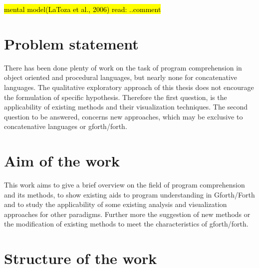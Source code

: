 \hl{mental model(LaToza et al., 2006) read: ..comment}
\begin{comment}
\@inproceedings\{Lieberman:1995:BGC:223904.223969,
author = \{Lieberman, Henry and Fry, Christopher\},
title = \{Bridging the Gulf Between Code and Behavior in Programming\},
booktitle = \{Proceedings of the SIGCHI Conference on Human Factors in Computing Systems\},
series = \{CHI '95\},
year = \{1995\},
isbn = \{0-201-84705-1\},
location = \{Denver, Colorado, USA\},
pages = \{480--486\},
numpages = \{7\},
url = \{http://dx.doi.org/10.1145/223904.223969\},
doi = \{10.1145/223904.223969\},
acmid = \{223969\},
publisher = \{ACM Press/Addison-Wesley Publishing Co.\},
address = \{New York, NY, USA\},
\}
\end{comment}


\section*{Problem statement}

There has been done plenty of work on the task of program comprehension in object oriented and procedural languages\cite{Cornelissen:2009:SSP:1638616.1639301}, but nearly none for concatenative languages. The qualitative exploratory approach of this thesis does not encourage the formulation of specific hypothesis. Therefore the first question, is the applicability of existing methods and their visualization techniques. The second question to be answered, concerns new approaches, which may be exclusive to concatenative languages or gforth/forth.

\section*{Aim of the work}

This work aims to give a brief overview on the field of program comprehension and its methods, to show existing aids to program understanding in Gforth/Forth and to study the applicability of some existing analysis and visualization approaches for other paradigms. Further more the suggestion of new methods or the modification of existing methods to meet the characteristics of gforth/forth.

\section*{Structure of the work}

